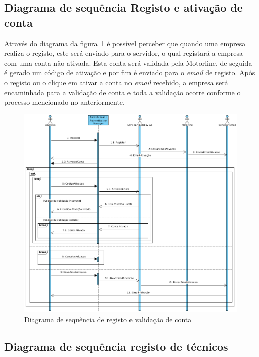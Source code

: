 \newpage

\subsection{Diagrama de sequência Registo e ativação de conta}

Através do diagrama da figura~\ref{fig:44} é possível perceber que quando uma empresa realiza o registo, este será enviado para o servidor, o qual registará a empresa com uma conta não ativada. Esta conta será validada pela Motorline, de seguida é gerado um código de ativação e por fim é enviado para o \textit{email} de registo. Após o registo ou o clique em ativar a conta no \textit{email} recebido, a empresa será encaminhada para a validação de conta e toda a validação ocorre conforme o processo mencionado no anteriormente.

\begin{figure}[htb]
  \centering
  \includegraphics[width=\textwidth]{images/diagramas/sequencia/diagrama_registo.png}
  \caption{Diagrama de sequência de registo e validação de conta}
  \label{fig:44}
\end{figure}

\newpage

\subsection{Diagrama de sequência registo de técnicos}

